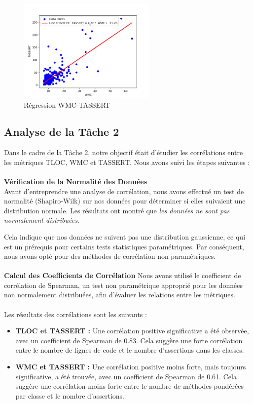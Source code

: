 \documentclass{proc}
\begin{document}
\begin{itemize}
\begin{itemize}
    \begin{figure}[H]
    \centering
    \includegraphics[width=0.6\textwidth]{images/tassert_wmc.png}
    \caption{Régression WMC-TASSERT}
    \label{fig:Régression WMC-TASSERT}
\end{figure}
\end{itemize}



\subsection{Analyse de la Tâche 2}

Dans le cadre de la Tâche 2, notre objectif était d'étudier les corrélations entre les métriques TLOC, WMC et TASSERT. Nous avons suivi les étapes suivantes :
\\\\
\textbf{Vérification de la Normalité des Données}\\
Avant d'entreprendre une analyse de corrélation, nous avons effectué un test de normalité (Shapiro-Wilk) sur nos données pour déterminer si elles suivaient une distribution normale. Les résultats ont montré que \textit{les données ne sont pas normalement distribuées.}

Cela indique que nos données ne suivent pas une distribution gaussienne, ce qui est un prérequis pour certains tests statistiques paramétriques. Par conséquent, nous avons opté pour des méthodes de corrélation non paramétriques.
\\\\
\textbf{Calcul des Coefficients de Corrélation}
Nous avons utilisé le coefficient de corrélation de Spearman, un test non paramétrique approprié pour les données non normalement distribuées, afin d'évaluer les relations entre les métriques.
\\\\
Les résultats des corrélations sont les suivants :
\begin{itemize}
\item \textbf{TLOC et TASSERT :} Une corrélation positive significative a été observée, avec un coefficient de Spearman de 0.83. Cela suggère une forte corrélation entre le nombre de lignes de code et le nombre d'assertions dans les classes.
\item \textbf{WMC et TASSERT :} Une corrélation positive moins forte, mais toujours significative, a été trouvée, avec un coefficient de Spearman de 0.61. Cela suggère une corrélation moins forte entre le nombre de méthodes pondérées par classe et le nombre d'assertions.
\end{itemize}


\end{itemize}
\end{document}
